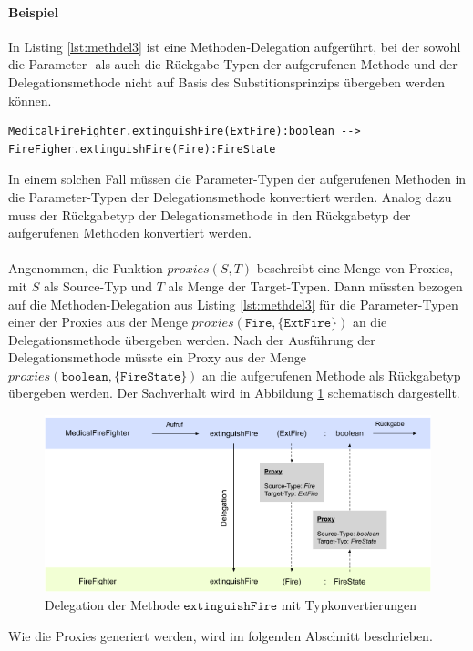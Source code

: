 \documentclass[a4paper,12pt]{article}
\begin{document}
\paragraph{Beispiel} In Listing \ref{lst:methdel3} ist eine Methoden-Delegation aufgerührt, bei der sowohl die Parameter- als auch die Rückgabe-Typen der aufgerufenen Methode und der Delegationsmethode nicht auf Basis des Substitionsprinzips übergeben werden können.
\begin{lstlisting}[style = dsl, caption = "Methoden-Delegation mit Typkonvertierung", captionpos = b]
	MedicalFireFighter.extinguishFire(ExtFire):boolean --> FireFigher.extinguishFire(Fire):FireState
\end{lstlisting}\label{lst:methdel3}
\noindent
In einem solchen Fall müssen die Parameter-Typen der aufgerufenen Methoden in die Parameter-Typen der Delegationsmethode konvertiert werden. Analog dazu muss der Rückgabetyp der Delegationsmethode in den Rückgabetyp der aufgerufenen Methoden konvertiert werden.\\\\
Angenommen, die Funktion $\mathit{proxies(S,T)}$ beschreibt eine Menge von Proxies, mit $S$ als Source-Typ und $T$ als Menge der Target-Typen. Dann müssten bezogen auf die Methoden-Delegation aus Listing \ref{lst:methdel3} für die Parameter-Typen einer der Proxies aus der Menge $\mathit{proxies(\texttt{Fire}, \{\texttt{ExtFire}\})}$ an die Delegationsmethode übergeben werden. Nach der Ausführung der Delegationsmethode müsste ein Proxy aus der Menge $\mathit{proxies(\texttt{boolean},\{\texttt{FireState}\})}$ an die aufgerufenen Methode als Rückgabetyp übergeben werden. Der Sachverhalt wird in Abbildung \ref{fig:DEL_extinguishFire} schematisch dargestellt.
\begin{figure}[H]
\includegraphics[width=\linewidth]{MDEL_extinguishFire}
\caption{Delegation der Methode $\texttt{extinguishFire}$ mit Typkonvertierungen}
\label{fig:DEL_extinguishFire}
\end{figure}
\noindent
Wie die Proxies generiert werden, wird im folgenden Abschnitt beschrieben.
\end{document}
